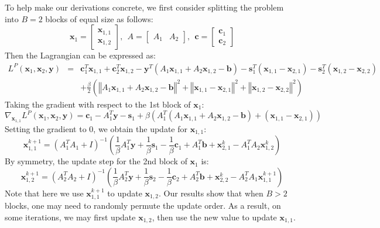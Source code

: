 \documentclass{article}
\begin{document}
To help make our derivations concrete, we first consider splitting the problem into $B=2$ blocks of equal size as follows:
\[
\mathbf{x}_{1}=\begin{bmatrix}\mathbf{x}_{1,1}\\
\mathbf{x}_{1,2}
\end{bmatrix},
 \ \  
A=\begin{bmatrix}A_{1} & A_{2}\end{bmatrix},
\ \ 
\mathbf{c}=\begin{bmatrix}\mathbf{c}_{1}\\
\mathbf{c}_{2}
\end{bmatrix}
\]
Then the Lagrangian can be expressed as:
\begin{eqnarray*}
L^{P}(\mathbf{x}_{1},\mathbf{x}_{2},\mathbf{y}) & = & \mathbf{c}_{1}^{T}\mathbf{x}_{1,1}+\mathbf{c}_{2}^{T}\mathbf{x}_{1,2}-\mathbf{y}^{T}\left(A_{1}\mathbf{x}_{1,1}+A_{2}\mathbf{x}_{1,2}-\mathbf{b}\right)-\mathbf{s}_{1}^{T}\left(\mathbf{x}_{1,1}-\mathbf{x}_{2,1}\right)-\mathbf{s}_{2}^{T}\left(\mathbf{x}_{1,2}-\mathbf{x}_{2,2}\right)\\
 &  & +\frac{\beta}{2}\left(\left\Vert A_{1}\mathbf{x}_{1,1}+A_{2}\mathbf{x}_{1,2}-\mathbf{b}\right\Vert ^{2}+\left\Vert \mathbf{x}_{1,1}-\mathbf{x}_{2,1}\right\Vert ^{2}+\left\Vert \mathbf{x}_{1,2}-\mathbf{x}_{2,2}\right\Vert ^{2}\right)
\end{eqnarray*}
Taking the gradient with respect to the 1st block of $\mathbf{x}_{1}$:
\[
\nabla_{\mathbf{x}_{1,1}}L^{P}(\mathbf{x}_{1},\mathbf{x}_{2},\mathbf{y})=\mathbf{c}_{1}-A_{1}^{T}\mathbf{y}-\mathbf{s}_{1}+\beta\left(A_{1}^{T}\left(A_{1}\mathbf{x}_{1,1}+A_{2}\mathbf{x}_{1,2}-\mathbf{b}\right)+\left(\mathbf{x}_{1,1}-\mathbf{x}_{2,1}\right)\right)
\]
Setting the gradient to 0, we obtain the update for $\mathbf{x}_{1,1}$:
\[
\mathbf{x}_{1,1}^{k+1}=\left(A_{1}^{T}A_{1}+I\right)^{-1}\left(\frac{1}{\beta}A_{1}^{T}\mathbf{y}+\frac{1}{\beta}\mathbf{s}_{1}-\frac{1}{\beta}\mathbf{c}_{1}+A_{1}^{T}\mathbf{b}+\mathbf{x}_{2,1}^{k}-A_{1}^{T}A_{2}\mathbf{x}_{1,2}^{k}\right)
\]
By symmetry, the update step for the 2nd block of $\mathbf{x}_{1}$
is:
\[
\mathbf{x}_{1,2}^{k+1}=\left(A_{2}^{T}A_{2}+I\right)^{-1}\left(\frac{1}{\beta}A_{2}^{T}\mathbf{y}+\frac{1}{\beta}\mathbf{s}_{2}-\frac{1}{\beta}\mathbf{c}_{2}+A_{2}^{T}\mathbf{b}+\mathbf{x}_{2,2}^{k}-A_{2}^{T}A_{1}\mathbf{x}_{1,1}^{k+1}\right)
\]
Note that here we use $\mathbf{x}_{1,1}^{k+1}$ to update $\mathbf{x}_{1,2}$. Our results show that when $B>2$ blocks, one may need to randomly permute the update order. As a result, on some iterations, we may first update $\mathbf{x}_{1,2}$, then use the new value to update $\mathbf{x}_{1,1}$. 
\end{document}
